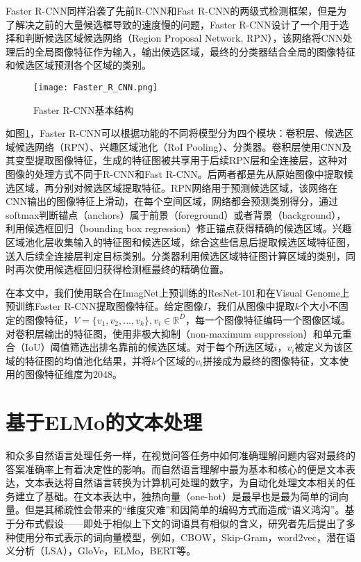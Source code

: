 Faster R-CNN同样沿袭了先前R-CNN和Fast R-CNN的两级式检测框架，但是为了解决之前的大量候选框导致的速度慢的问题，Faster R-CNN设计了一个用于选择和判断候选区域候选网络（Region Proposal Network, RPN），该网络将CNN处理后的全局图像特征作为输入，输出候选区域，最终的分类器结合全局的图像特征和候选区域预测各个区域的类别。
\begin{figure}[H]
	\texttt{[image: Faster\_R\_CNN.png]}
	\caption{Faster R-CNN基本结构}
	\label{Faster_R_CNN}
\end{figure}

如图\ref{Faster_R_CNN}，Faster R-CNN可以根据功能的不同将模型分为四个模块：卷积层、候选区域候选网络（RPN）、兴趣区域池化（RoI Pooling）、分类器。卷积层使用CNN及其变型提取图像特征，生成的特征图被共享用于后续RPN层和全连接层，这种对图像的处理方式不同于R-CNN和Fast R-CNN。后两者都是先从原始图像中提取候选区域，再分别对候选区域提取特征。RPN网络用于预测候选区域，该网络在CNN输出的图像特征上滑动，在每个空间区域，网络都会预测类别得分，通过softmax判断锚点（anchors）属于前景（foreground）或者背景（background），利用候选框回归（bounding box regression）修正锚点获得精确的候选区域。兴趣区域池化层收集输入的特征图和候选区域，综合这些信息后提取候选区域特征图，送入后续全连接层判定目标类别。分类器利用候选区域特征图计算区域的类别，同时再次使用候选框回归获得检测框最终的精确位置。

在本文中，我们使用联合在ImagNet上预训练的ResNet-101和在Visual Genome上预训练Faster R-CNN提取图像特征。给定图像$I$，我们从图像中提取$k$个大小不固定的图像特征，$V=\{v_1, v_2, ..., v_k\}, v_i \in \mathbb{R}^D$，每一个图像特征编码一个图像区域。对卷积层输出的特征图，使用非极大抑制（non-maximum suppression）和单元重合（IoU）阈值筛选出排名靠前的候选区域。对于每个所选区域$i$，$v_i$被定义为该区域的特征图的均值池化结果，并将$k$个区域的$v_i$拼接成为最终的图像特征，文本使用的图像特征维度为2048。

\section{基于ELMo的文本处理}
和众多自然语言处理任务一样，在视觉问答任务中如何准确理解问题内容对最终的答案准确率上有着决定性的影响。而自然语言理解中最为基本和核心的便是文本表达，文本表达将自然语言转换为计算机可处理的数字，为自动化处理文本相关的任务建立了基础。在文本表达中，独热向量（one-hot）是最早也是最为简单的词向量。但是其稀疏性会带来的“维度灾难”和因简单的编码方式而造成“语义鸿沟”。基于分布式假设——即处于相似上下文的词语具有相似的含义，研究者先后提出了多种使用分布式表示的词向量模型，例如，CBOW，Skip-Gram，word2vec，潜在语义分析（LSA），GloVe，ELMo，BERT等。

